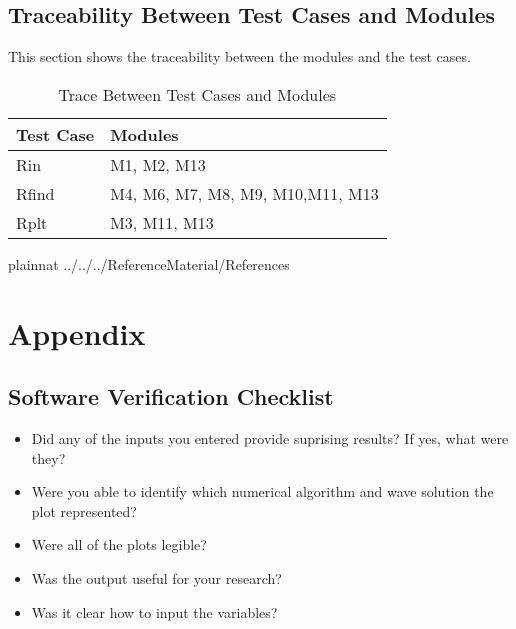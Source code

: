 \documentclass[12pt, titlepage]{article}
\begin{document}
\subsection{Traceability Between Test Cases and Modules}

This section shows the traceability between the modules and the test cases.

\begin{table}[H]
	\centering
	\begin{tabular}{p{} p{}}
		\toprule
		\textbf{Test Case} & \textbf{Modules}\\
		\midrule
			Rin & M1, M2, M13\\
			Rfind & M4, M6, M7, M8, M9, M10,M11, M13\\
			Rplt & M3, M11, M13 \\
		\bottomrule
	\end{tabular}
	\caption{Trace Between Test Cases and Modules}
	\label{TblRT}
\end{table}

\clearpage
 {plainnat}
 {../../../ReferenceMaterial/References}

\newpage

\section{Appendix} 
\label{app}

\subsection{Software Verification Checklist} 
\label{softwarevercheck}
\begin{itemize}
	\item Did any of the inputs you entered provide suprising results? If yes, 
	what were they?
	\item Were you able to identify which numerical algorithm and wave solution 
	the plot represented? 
	\item Were all of the plots legible? 
	\item Was the output useful for your research? 
	\item Was it clear how to input the variables? 
\end{itemize}  
\end{document}
